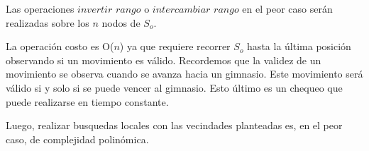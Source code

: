 Las operaciones $invertir$ $rango$ o $intercambiar$ $rango$ en el peor caso serán realizadas sobre los $n$ nodos de $S_o$.

La operación costo es O($n$) ya que requiere recorrer $S_o$ hasta la última posición observando si un movimiento es válido. Recordemos que la validez de un movimiento se observa cuando se avanza hacia un gimnasio. Este movimiento será válido si y solo si se puede vencer al gimnasio. Esto último es un chequeo que puede realizarse en tiempo constante.  

Luego, realizar busquedas locales con las vecindades planteadas es, en el peor caso, de complejidad polinómica. 
